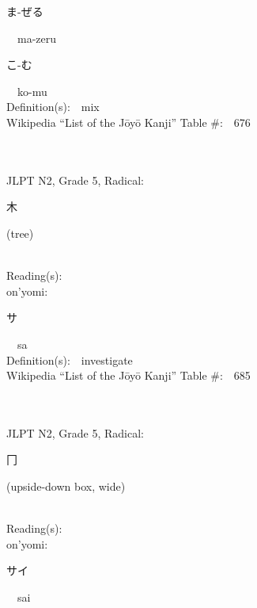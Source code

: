 \begin{multicols}{2}
{\hspace*{2em}}{\begin{CJK}{UTF8}{min} ま-ぜる \end{CJK}}\ \ ma-zeru\ \ \\
{\hspace*{2em}}{\begin{CJK}{UTF8}{min} こ-む \end{CJK}}\ \ ko-mu\ \ \\
Definition(s):\ \ mix \\
Wikipedia ``List of the J\=oy\=o Kanji'' Table \#:\ \ 676 \\
\ \ \\
{\fontsize{34pt}{40pt}  }\ \ \\  %
{JLPT N2, Grade 5, Radical:\ \ {\begin{CJK}{UTF8}{min} 木 \end{CJK}} (tree) } \\
Reading(s):\ \ \\
{\hspace*{1em}}on'yomi:\ \ \\
{\hspace*{2em}}{\begin{CJK}{UTF8}{min} サ \end{CJK}}\ \ sa\ \ \\
Definition(s):\ \ investigate \\
Wikipedia ``List of the J\=oy\=o Kanji'' Table \#:\ \ 685 \\
\ \ \\
{\fontsize{34pt}{40pt}  }\ \ \\  %
{JLPT N2, Grade 5, Radical:\ \ {\begin{CJK}{UTF8}{min} 冂 \end{CJK}} (upside-down box, wide) } \\
Reading(s):\ \ \\
{\hspace*{1em}}on'yomi:\ \ \\
{\hspace*{2em}}{\begin{CJK}{UTF8}{min} サイ \end{CJK}}\ \ sai\ \ \\

\end{multicols}
